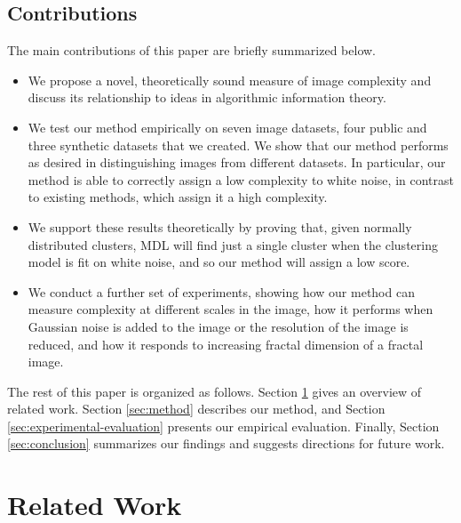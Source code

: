 \documentclass[a4paper,fleqn]{cas-sc}
\theoremstyle{remark}
\begin{document}
\subsection{Contributions}
The main contributions of this paper are briefly summarized below.
\begin{itemize}  
    \item We propose a novel, theoretically sound measure of image complexity and discuss its relationship to ideas in algorithmic information theory.
    \item We test our method empirically on seven image datasets, four public and three synthetic datasets that we created. We show that our method performs as desired in distinguishing images from different datasets. In particular, our method is able to correctly assign a low complexity to white noise, in contrast to existing methods, which assign it a high complexity.
    \item We support these results theoretically by proving that, given normally distributed clusters, MDL will find just a single cluster when the clustering model is fit on white noise, and so our method will assign a low score.
    \item We conduct a further set of experiments, showing how our method can measure complexity at different scales in the image, how it performs when Gaussian noise is added to the image or the resolution of the image is reduced, and how it responds to increasing fractal dimension of a fractal image. 
\end{itemize}
The rest of this paper is organized as follows. Section \ref{sec:related-work} gives an overview of related work. Section \ref{sec:method} describes our method, and Section \ref{sec:experimental-evaluation} presents our empirical evaluation. Finally, Section \ref{sec:conclusion} summarizes our findings and suggests directions for future work.


\section{Related Work} \label{sec:related-work}
\end{document}
